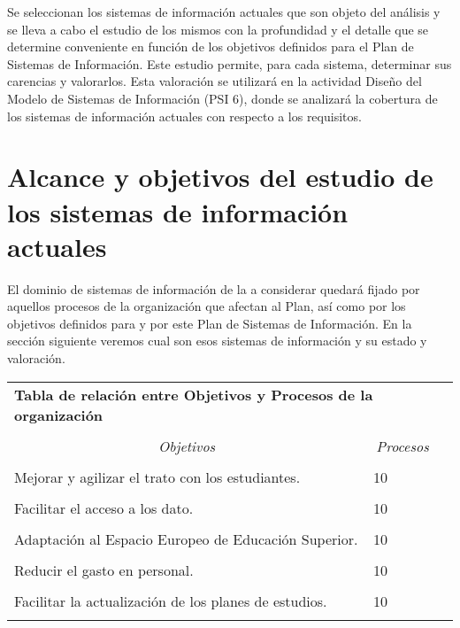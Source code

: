 \documentclass[11pt,a4paper,spanish,twoside]{book}
\begin{document}
Se seleccionan los
sistemas de información actuales que son objeto del análisis y se lleva a
cabo el estudio de los mismos con la profundidad y el detalle que se
determine conveniente en función de los objetivos definidos para el Plan de
Sistemas de Información. Este estudio permite, para cada sistema, determinar
sus carencias y valorarlos. Esta valoración se utilizará en la actividad
Diseño del Modelo de Sistemas de Información (PSI 6), donde se analizará la
cobertura de los sistemas de información actuales con respecto a los
requisitos.

\section{Alcance y objetivos del estudio de los sistemas de 
  información actuales} 
El dominio de sistemas de información de la a considerar quedará fijado por
aquellos procesos de la organización que afectan al Plan, así como por los 
objetivos definidos para y por este Plan de Sistemas de Información. En la 
sección siguiente veremos cual son esos sistemas de información y su estado y 
valoración.

\begin{table}[!ht]
  \centering
  \begin{tabular}{lp{5cm}c}
    \multicolumn{2}{l}{\Large \textbf{Tabla de relación entre Objetivos y Procesos de la organización} } \\ \\
    \multicolumn{1}{c}{\emph{Objetivos}} & 
    \multicolumn{1}{c}{\emph{Procesos}} \\
    \hline \\
    Mejorar y agilizar el trato con los estudiantes.         & 10 \\ \\
    Facilitar el acceso a los dato.         & 10 \\ \\
    Adaptación al Espacio Europeo de Educación Superior.         & 10 \\ \\
    Reducir el gasto en personal.         & 10 \\ \\
    Facilitar la actualización de los planes de estudios.         & 10 \\ \\
    \hline
  \end{tabular}
\end{table}
\end{document}
